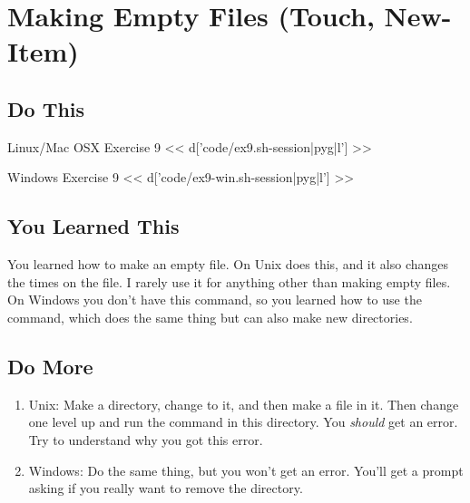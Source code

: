 \chapter{Making Empty Files (Touch, New-Item)}

\section{Do This}

\begin{code}{Linux/Mac OSX Exercise 9}
<< d['code/ex9.sh-session|pyg|l'] >>
\end{code}

\begin{code}{Windows Exercise 9}
<< d['code/ex9-win.sh-session|pyg|l'] >>
\end{code}

\section{You Learned This}

You learned how to make an empty file.  On Unix  does this, and
it also changes the times on the file.  I rarely use it for anything other than
making empty files.  On Windows you don't have this command, so you learned
how to use the  command, which does the same thing but can
also make new directories.

\section{Do More}

\begin{enumerate}
\item Unix: Make a directory, change to it, and then make a file in it.  Then change
    one level up and run the  command in this directory.  You
    \emph{should} get an error.  Try to understand why you got this error.
\item Windows: Do the same thing, but you won't get an error.  You'll get a prompt
    asking if you really want to remove the directory.
\end{enumerate}

